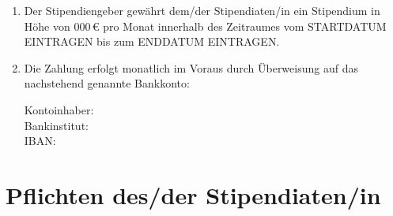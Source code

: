 \documentclass[
  paper=a4,
  fontsize=12pt,
  DIV=16,
  parskip=full,
  headinclude=true,
]{scrartcl}
\begin{document}
\begin{enumerate}[\qquad(1)]
	\item Der Stipendiengeber gewährt dem/der Stipendiaten/in ein
		Stipendium in Höhe von \num{000}\,€ pro Monat innerhalb
		des Zeitraumes vom STARTDATUM EINTRAGEN bis zum ENDDATUM
		EINTRAGEN.
	\item Die Zahlung erfolgt monatlich im Voraus durch Überweisung auf
		das nachstehend genannte Bankkonto:

		Kontoinhaber:\\
		Bankinstitut:\\
		IBAN:\\
\end{enumerate}

\section{Pflichten des/der Stipendiaten/in}
\end{document}
